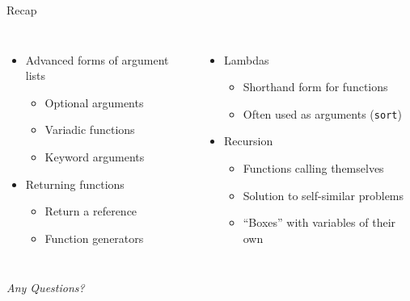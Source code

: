 
\begin{frame}[t,plain]
\titlepage
\end{frame}


\begin{frame}{Recap}
%
\begin{columns}[T]
\begin{itemize}
\item Advanced forms of argument lists
	\begin{itemize}
	\item Optional arguments
	\item Variadic functions
	\item Keyword arguments
	\end{itemize}
\item Returning functions
	\begin{itemize}
	\item Return a reference
	\item Function generators
	\end{itemize}
\end{itemize}
%
\begin{itemize}
\item Lambdas
	\begin{itemize}
	\item Shorthand form for functions
	\item Often used as arguments (\thus \texttt{sort})
	\end{itemize}
\item Recursion
	\begin{itemize}
	\item Functions calling themselves
	\item Solution to self-similar problems
	\item \enquote{Boxes} with variables of their own
	\end{itemize}
\end{itemize}

\end{columns}
%
\begin{center}
	\emph{Any Questions?}
\end{center}
%
\end{frame}

